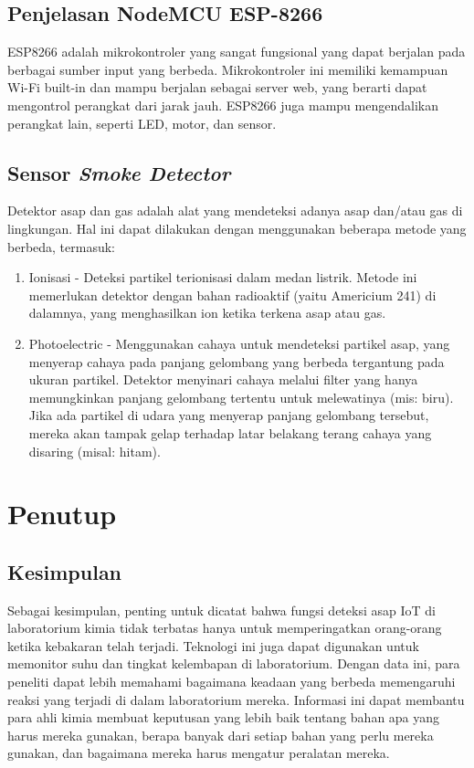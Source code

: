 \documentclass{article}
\begin{document}
    \subsection{Penjelasan NodeMCU ESP-8266}
    ESP8266 adalah mikrokontroler yang sangat fungsional yang
    dapat berjalan pada berbagai sumber input yang berbeda.
    Mikrokontroler ini memiliki kemampuan Wi-Fi built-in dan
    mampu berjalan sebagai server web, yang berarti dapat
    mengontrol perangkat dari jarak jauh. ESP8266 juga mampu
    mengendalikan perangkat lain, seperti LED, motor, dan
    sensor.

    \subsection{Sensor \textit{Smoke Detector}}
 

    Detektor asap dan gas adalah alat yang mendeteksi adanya
    asap dan/atau gas di lingkungan. Hal ini dapat dilakukan
    dengan menggunakan beberapa metode yang berbeda, termasuk:
    \begin{enumerate}
        \item Ionisasi - Deteksi partikel terionisasi dalam medan
             listrik. Metode ini memerlukan detektor dengan bahan
             radioaktif (yaitu Americium 241) di dalamnya, yang
             menghasilkan ion ketika terkena asap atau gas.

        \item Photoelectric - Menggunakan cahaya untuk mendeteksi
                partikel asap, yang menyerap cahaya pada panjang gelombang
                yang berbeda tergantung pada ukuran partikel. Detektor
                menyinari cahaya melalui filter yang hanya memungkinkan
                panjang gelombang tertentu untuk melewatinya (mis: biru).
                Jika ada partikel di udara yang menyerap panjang gelombang
                tersebut, mereka akan tampak gelap terhadap latar belakang
                terang cahaya yang disaring (misal: hitam).
    \end{enumerate}
    \section{Penutup}
    \subsection{Kesimpulan}
    Sebagai kesimpulan, penting untuk dicatat bahwa fungsi
    deteksi asap IoT di laboratorium kimia tidak terbatas
    hanya untuk memperingatkan orang-orang ketika kebakaran
    telah terjadi. Teknologi ini juga dapat digunakan untuk
    memonitor suhu dan tingkat kelembapan di laboratorium.
    Dengan data ini, para peneliti dapat lebih memahami
    bagaimana keadaan yang berbeda memengaruhi reaksi yang
    terjadi di dalam laboratorium mereka. Informasi ini
    dapat membantu para ahli kimia membuat keputusan yang
    lebih baik tentang bahan apa yang harus mereka gunakan,
    berapa banyak dari setiap bahan yang perlu mereka
    gunakan, dan bagaimana mereka harus mengatur peralatan
    mereka.
\end{document}

